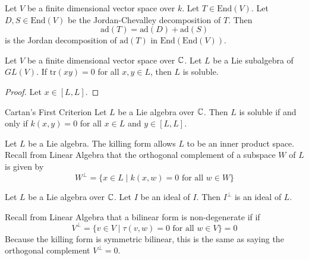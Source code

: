 \documentclass[a4paper]{article}
\begin{document}
\begin{lmm}{}{} Let $V$ be a finite dimensional vector space over $k$. Let $T\in\text{End}(V)$. Let $D,S\in\text{End}(V)$ be the Jordan-Chevalley decomposition of $T$. Then $$\text{ad}(T)=\text{ad}(D)+\text{ad}(S)$$ is the Jordan decomposition of $\text{ad}(T)$ in $\text{End}(\text{End}(V))$. 
\end{lmm}

\begin{prp}{}{} Let $V$ be a finite dimensional vector space over $\mathbb{C}$. Let $L$ be a Lie subalgebra of $GL(V)$. If $\text{tr}(xy)=0$ for all $x,y\in L$, then $L$ is soluble. \tcbline
\begin{proof}
Let $x\in [L,L]$. 
\end{proof}
\end{prp}

\begin{thm}{Cartan's First Criterion}{} Let $L$ be a Lie algebra over $\mathbb{C}$. Then $L$ is soluble if and only if $k(x,y)=0$ for all $x\in L$ and $y\in[L,L]$. 
\end{thm}

Let $L$ be a Lie algebra. The killing form allows $L$ to be an inner product space. Recall from Linear Algebra that the orthogonal complement of a subspace $W$ of $L$ is given by $$W^\perp=\{x\in L\;|\;k(x,w)=0\text{ for all }w\in W\}$$

\begin{lmm}{}{} Let $L$ be a Lie algebra over $\mathbb{C}$. Let $I$ be an ideal of $I$. Then $I^\perp$ is an ideal of $L$. 
\end{lmm}

Recall from Linear Algebra that a bilinear form is non-degenerate if  if $$V^\perp=\{v\in V\;|\;\tau(v,w)=0\text{ for all }w\in V\}=0$$ Because the killing form is symmetric bilinear, this is the same as saying the orthogonal complement $V^\perp=0$. 
\end{document}
